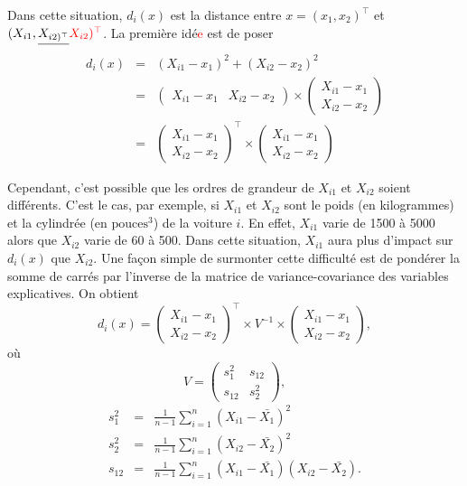 \documentclass[11pt]{article}
\begin{document}
\noindent Dans cette situation, $d_i(x)$ est la distance entre $x=(x_1,x_2)^\top$ et $(X_{i1},\sout{X_{i2)^\top}}\textcolor{red}{X_{i2})^\top}$. La premi\`ere id\'e\textcolor{red}{e} est de poser
\begin{eqnarray*}
d_i(x) &=& (X_{i1}-x_1)^2 + (X_{i2}-x_2)^2 \\ 
&=& \begin{pmatrix} X_{i1}-x_1 & X_{i2}-x_2 \end{pmatrix} \times \begin{pmatrix} X_{i1}-x_1 \\ X_{i2}-x_2 \end{pmatrix} \\
&=& {\begin{pmatrix} X_{i1}-x_1 \\ X_{i2}-x_2 \end{pmatrix}}^\top \times \begin{pmatrix} X_{i1}-x_1 \\ X_{i2}-x_2 \end{pmatrix}
\end{eqnarray*}


\noindent Cependant, c'est possible que les ordres de grandeur de $X_{i1}$ et $X_{i2}$ soient diff\'erents. C'est le cas, par exemple, si $X_{i1}$ et $X_{i2}$ sont le poids (en kilogrammes) et la cylindr\'ee (en $\mbox{pouces}^3$) de la voiture $i$. En effet, $X_{i1}$ varie de 1500 \`a 5000 alors que $X_{i2}$ varie de 60 \`a 500. Dans cette situation, $X_{i1}$ aura plus d'impact sur $d_i(x)$ que $X_{i2}$. Une fa\c{c}on simple de surmonter cette difficult\'e est de pond\'erer la somme de carr\'es par l'inverse de la matrice de variance-covariance des variables explicatives. On obtient
$$d_i(x) = {\begin{pmatrix} X_{i1}-x_1 \\ X_{i2}-x_2 \end{pmatrix}}^\top \times V^{-1} \times \begin{pmatrix} X_{i1}-x_1 \\ X_{i2}-x_2 \end{pmatrix},$$
o\`u
$$V = \begin{pmatrix} s_1^2 & s_{12} \\ s_{12} & s_2^2 \end{pmatrix},$$
\begin{eqnarray*}
s_1^2 &=& \frac{1}{n-1} \sum_{i=1}^n (X_{i1}-\bar{X_1})^2 \\ 
s_2^2 &=& \frac{1}{n-1} \sum_{i=1}^n (X_{i2}-\bar{X_2})^2 \\ 
s_{12} &=& \frac{1}{n-1} \sum_{i=1}^n (X_{i1}-\bar{X_1})(X_{i2}-\bar{X_2}).
\end{eqnarray*}
\end{document}
